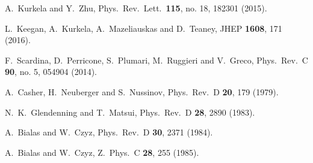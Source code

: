 \documentclass[aps,prc,a4paper,nofootinbib,
preprintnumbers,superscriptaddress,twocolumn,showpacs,showkeys]{revtex4}
\begin{document}
\begin{thebibliography}{99}
  A.~Kurkela and Y.~Zhu,
  Phys.\ Rev.\ Lett.\  {\bf 115}, no. 18, 182301 (2015).
  
  L.~Keegan, A.~Kurkela, A.~Mazeliauskas and D.~Teaney,
  JHEP {\bf 1608}, 171 (2016).
 
  F.~Scardina, D.~Perricone, S.~Plumari, M.~Ruggieri and V.~Greco,
  Phys.\ Rev.\ C {\bf 90}, no. 5, 054904 (2014).
 
  

  A.~Casher, H.~Neuberger and S.~Nussinov,
  Phys.\ Rev.\ D {\bf 20}, 179 (1979).
  
  N.~K.~Glendenning and T.~Matsui,
  Phys.\ Rev.\ D {\bf 28}, 2890 (1983).
  
  A.~Bialas and W.~Czyz,
  Phys.\ Rev.\ D {\bf 30}, 2371 (1984).
  
  A.~Bialas and W.~Czyz,
  Z.\ Phys.\ C {\bf 28}, 255 (1985).
  

\end{thebibliography}
\end{document}
